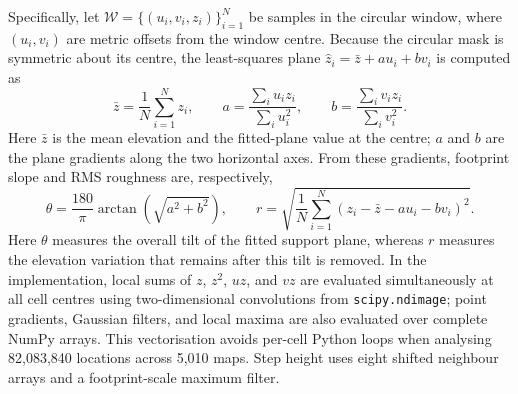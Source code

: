 \documentclass[11pt]{article}
\begin{document}
Specifically, let $\mathcal{W}=\{(u_i,v_i,z_i)\}_{i=1}^{N}$ be samples in the
circular window, where $(u_i,v_i)$ are metric offsets from the window centre.
Because the circular mask is symmetric about its centre, the least-squares
plane $\widehat z_i=\bar z+a u_i+b v_i$ is computed as
\begin{equation}
  \bar z=\frac{1}{N}\sum_{i=1}^{N}z_i,\qquad
  a=\frac{\sum_i u_i z_i}{\sum_i u_i^2},\qquad
  b=\frac{\sum_i v_i z_i}{\sum_i v_i^2}.
\end{equation}
Here $\bar z$ is the mean elevation and the fitted-plane value at the centre;
$a$ and $b$ are the plane gradients along the two horizontal axes. From these
gradients, footprint slope and RMS
roughness are, respectively,
\begin{equation}
  \theta=\frac{180}{\pi}\arctan\!\left(\sqrt{a^2+b^2}\right),\qquad
  r=\sqrt{\frac{1}{N}\sum_{i=1}^{N}
  \left(z_i-\bar z-a u_i-b v_i\right)^2}.
\end{equation}
Here $\theta$ measures the overall tilt of the fitted support plane, whereas
$r$ measures the elevation variation that remains after this tilt is removed.
In the implementation, local sums of $z$, $z^2$, $uz$, and $vz$ are evaluated
simultaneously at all cell centres using two-dimensional convolutions from
\texttt{scipy.ndimage}; point gradients, Gaussian filters, and local maxima are
also evaluated over complete NumPy arrays. This vectorisation avoids per-cell
Python loops when analysing 82,083,840 locations across 5,010 maps. Step height
uses eight shifted neighbour arrays and a footprint-scale maximum filter.
\end{document}
